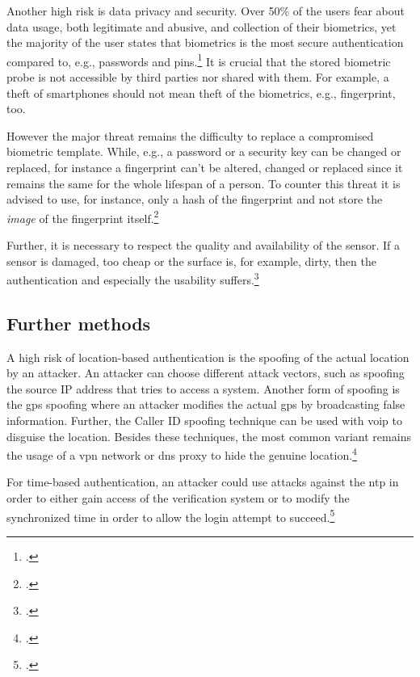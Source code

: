 Another high risk is data privacy and security. Over 50\% of the users fear about data usage, both legitimate and abusive, and collection of their biometrics, yet the majority of the user states that biometrics is the most secure authentication compared to, e.g., passwords and \glspl{pin}.\footcite[See][8]{ibm-security} It is crucial that the stored biometric probe is not accessible by third parties nor shared with them. For example, a theft of smartphones should not mean theft of the biometrics, e.g., fingerprint, too.

However the major threat remains the difficulty to replace a compromised biometric template. While, e.g., a password or a security key can be changed or replaced, for instance a fingerprint can't be altered, changed or replaced since it remains the same for the whole lifespan of a person. To counter this threat it is advised to use, for instance, only a hash of the fingerprint and not store the \textit{image} of the fingerprint itself.\footcite[See][266]{shostack2014threat}

Further, it is necessary to respect the quality and availability of the sensor. If a sensor is damaged, too cheap or the surface is, for example, dirty, then the authentication and especially the usability suffers.\footcite[See][37]{265831}

\subsection{Further methods}

A high risk of location-based authentication is the spoofing of the actual location by an attacker. An attacker can choose different attack vectors, such as spoofing the source IP address that tries to access a system. Another form of spoofing is the \gls{gps} spoofing where an attacker modifies the actual \gls{gps} by broadcasting false information. Further, the Caller ID spoofing technique can be used with \gls{voip} to disguise the location. Besides these techniques, the most common variant remains the usage of a \gls{vpn} network or \gls{dns} proxy to hide the genuine location.\footcites[See][138--145]{517355}[See][Chapter 4.5.3]{30270}[See][115--116,133]{eckert-it-sec-9}

For time-based authentication, an attacker could use attacks against the \gls{ntp} in order to either gain access of the verification system or to modify the synchronized time in order to allow the login attempt to succeed.\footcite[See][]{malhotraattacking}

